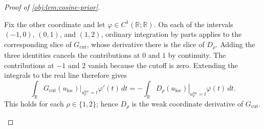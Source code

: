 \begin{proof}[Proof of \cref{obj:lem:cosine-prior}]
\begin{enumerate}
Fix the other coordinate and let \(\varphi\in C^1(\mathbb R;\mathbb R)\).
On each of the intervals \((-1,0)\), \((0,1)\), and \((1,2)\), ordinary
integration by parts applies to the corresponding slice of
\(G_{\mathrm{cut}}\), whose derivative there is the slice of \(D_\rho\).
Adding the three identities cancels the contributions at \(0\) and \(1\)
by continuity. The contributions at \(-1\) and \(2\) vanish because the
cutoff is zero. Extending the integrals to the real line therefore gives
\[
\int_{\mathbb R}
 \left.G_{\mathrm{cut}}(u_{\mathrm{loc}})
 \right|_{u_\rho^{\mathrm{loc}}=t}
 \varphi'(t)\,dt
=
-\int_{\mathbb R}
 \left.D_\rho(u_{\mathrm{loc}})
 \right|_{u_\rho^{\mathrm{loc}}=t}
 \varphi(t)\,dt.
\]
This holds for each \(\rho\in\{1,2\}\); hence \(D_\rho\) is the weak
coordinate derivative of \(G_{\mathrm{cut}}\).


\end{enumerate}
\end{proof}
